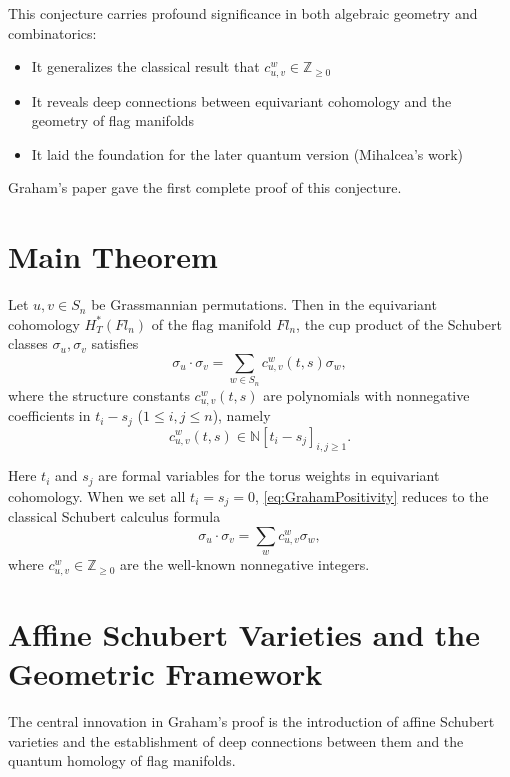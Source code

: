 This conjecture carries profound significance in both algebraic geometry and combinatorics:
\begin{itemize}
\item It generalizes the classical result that $c_{u,v}^w \in \mathbb{Z}_{\geq 0}$
\item It reveals deep connections between equivariant cohomology and the geometry of flag manifolds
\item It laid the foundation for the later quantum version (Mihalcea's work)
\end{itemize}

Graham's paper gave the first complete proof of this conjecture.

\section{Main Theorem}

\begin{Theorem}
\label{th:GrahamMainPositivity}
Let $u, v \in S_n$ be Grassmannian permutations. Then in the equivariant cohomology $H_T^*(Fl_n)$ of the flag manifold $Fl_n$, the cup product of the Schubert classes $\sigma_u, \sigma_v$ satisfies
\begin{equation}
\sigma_u \cdot \sigma_v = \sum_{w \in S_n} c_{u,v}^w(t,s) \sigma_w,
\label{eq:GrahamPositivity}
\end{equation}
where the structure constants $c_{u,v}^w(t,s)$ are polynomials with nonnegative coefficients in $t_i - s_j$ ($1 \leq i, j \leq n$), namely
$$c_{u,v}^w(t,s) \in \mathbb{N}[t_i - s_j]_{i,j \geq 1}.$$
\end{Theorem}

\begin{Remark}
Here $t_i$ and $s_j$ are formal variables for the torus weights in equivariant cohomology. When we set all $t_i = s_j = 0$, \cref{eq:GrahamPositivity} reduces to the classical Schubert calculus formula
$$\sigma_u \cdot \sigma_v = \sum_w c_{u,v}^w \sigma_w,$$
where $c_{u,v}^w \in \mathbb{Z}_{\geq 0}$ are the well-known nonnegative integers.
\end{Remark}

\section{Affine Schubert Varieties and the Geometric Framework}

The central innovation in Graham's proof is the introduction of affine Schubert varieties and the establishment of deep connections between them and the quantum homology of flag manifolds.

